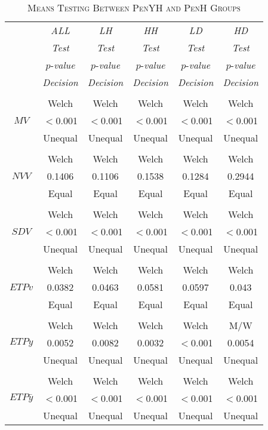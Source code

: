 \begin{table}[h]
\centering
\caption{\textsc{Means Testing Between PenYH and PenH Groups}}
\begin{tabular*}{0.75\textwidth}{@{\extracolsep{\fill}} c | c c c c c}
	& {\textit{ALL}} & {\textit{LH}} & {\textit{HH}} & {\textit{LD}} & {\textit{HD}} \\
	\cline{2-6}  
	& {\textit{Test}} & {\textit{Test}} & {\textit{Test}} & {\textit{Test}} & {\textit{Test}} \\
	& $p$-{\textit{value}} & $p$-{\textit{value}} & $p$-{\textit{value}} & $p$-{\textit{value}} & $p$-{\textit{value}} \\
	& {\textit{Decision}} & {\textit{Decision}} & {\textit{Decision}} & {\textit{Decision}} & {\textit{Decision}} \\
	\hline 	\hline
	\\
	& Welch & Welch & Welch & Welch & Welch \\
	$MV$ & $<$0.001 & $<$0.001 & $<$0.001 & $<$0.001 & $<$0.001 \\
	& Unequal & Unequal & Unequal & Unequal & Unequal \\
	\hline
	\\
	& Welch & Welch & Welch & Welch & Welch \\
	$NVV$ & 0.1406 & 0.1106 & 0.1538 & 0.1284 & 0.2944 \\
	& Equal & Equal & Equal & Equal & Equal \\
	\hline
	\\
	& Welch & Welch & Welch & Welch & Welch \\
	$SDV$ & $<$0.001 & $<$0.001 & $<$0.001 & $<$0.001 & $<$0.001 \\
	& Unequal & Unequal & Unequal & Unequal & Unequal \\
	\hline
	\\
	& Welch & Welch & Welch & Welch & Welch \\
	$ETPv$ & 0.0382 & 0.0463 & 0.0581 & 0.0597 & 0.043 \\
	& Equal & Equal & Equal & Equal & Equal \\
	\hline
	\\
	& Welch & Welch & Welch & Welch & M/W \\
	$ETPy$ & 0.0052 & 0.0082 & 0.0032 & $<$0.001 & 0.0054 \\
	& Unequal & Unequal & Unequal & Unequal & Unequal \\
	\hline
	\\
	& Welch & Welch & Welch & Welch & Welch \\
	$ETP\bar{y}$ & $<$0.001 & $<$0.001 & $<$0.001 & $<$0.001 & $<$0.001 \\
	& Unequal & Unequal & Unequal & Unequal & Unequal \\
	\hline
\end{tabular*}
\label{table:PenCTMeansInterYOH}
\end{table}

